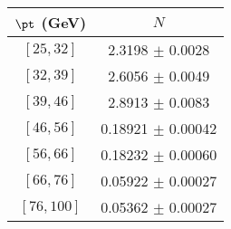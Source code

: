 \begin{tabular}{c||c}
$\pt$ (GeV) & $N$  \\
\hline
$[25, 32]$ & 2.3198 $\pm$ 0.0028\\
$[32, 39]$ & 2.6056 $\pm$ 0.0049\\
$[39, 46]$ & 2.8913 $\pm$ 0.0083\\
$[46, 56]$ & 0.18921 $\pm$ 0.00042\\
$[56, 66]$ & 0.18232 $\pm$ 0.00060\\
$[66, 76]$ & 0.05922 $\pm$ 0.00027\\
$[76, 100]$ & 0.05362 $\pm$ 0.00027\\
\end{tabular}

